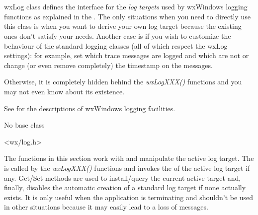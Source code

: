 
\section{}\label{wxlog}

wxLog class defines the interface for the {\it log targets} used by wxWindows
logging functions as explained in the .
The only situations when you need to directly use this class is when you want
to derive your own log target because the existing ones don't satisfy your
needs. Another case is if you wish to customize the behaviour of the standard
logging classes (all of which respect the wxLog settings): for example, set
which trace messages are logged and which are not or change (or even remove
completely) the timestamp on the messages.

Otherwise, it is completely hidden behind the {\it wxLogXXX()} functions and
you may not even know about its existence.

See  for the descriptions of wxWindows
logging facilities.


No base class


<wx/log.h>



The functions in this section work with and manipulate the active log target.
The  is called by the {\it wxLogXXX()} functions
and invokes the  of the active log target if any.
Get/Set methods are used to install/query the current active target and,
finally,  disables the
automatic creation of a standard log target if none actually exists. It is
only useful when the application is terminating and shouldn't be used in other
situations because it may easily lead to a loss of messages.

